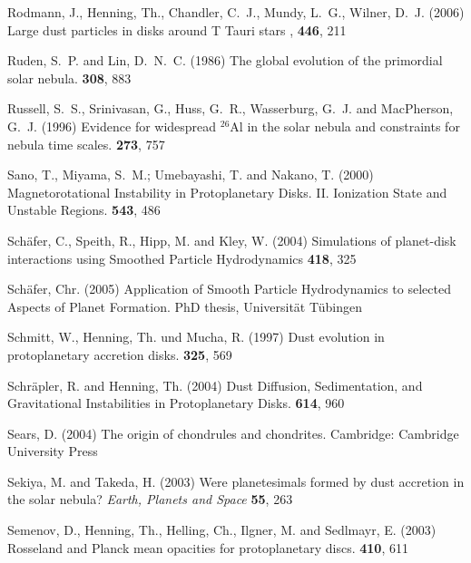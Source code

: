 \begin{literature}
\item
Rodmann, J., Henning, Th., Chandler, C.~J., Mundy, L.~G.,
Wilner, D.~J. (2006) Large dust particles in disks around T Tauri stars 
\aap, \textbf{446}, 211 

\item
Ruden, S.~P. and Lin, D.~N.~C. (1986) The global evolution of the primordial
solar nebula. \apj \textbf{308}, 883

\item
Russell, S.~S., Srinivasan, G., Huss, G.~R., Wasserburg, G.~J. and MacPherson,
G.~J. (1996) Evidence for widespread $^{26}$Al in the solar nebula and
constraints for nebula time scales. \sci \textbf{273}, 757

\item
Sano, T., Miyama, S.~M.; Umebayashi, T. and Nakano, T. (2000)
Magnetorotational Instability in Protoplanetary Disks. II. Ionization State
and Unstable Regions.
\apj \textbf{543}, 486

\item
Sch\"afer, C., Speith, R., Hipp, M. and Kley, W. (2004) Simulations of 
planet-disk interactions using Smoothed Particle Hydrodynamics 
\aap \textbf{418}, 325

\item
Sch\"afer, Chr. (2005) Application of Smooth Particle Hydrodynamics to
selected Aspects of Planet Formation. PhD thesis, Universit\"at T\"ubingen

\item
Schmitt, W., Henning, Th. und Mucha, R. (1997) Dust evolution in
protoplanetary accretion disks. \aap \textbf{325}, 569

\item
Schr\"apler, R. and Henning, Th. (2004) Dust Diffusion, Sedimentation, and
Gravitational Instabilities in Protoplanetary Disks. \apj \textbf{614}, 960

\item
Sears, D. (2004) The origin of chondrules and chondrites. Cambridge:
Cambridge University Press

\item
Sekiya, M. and Takeda, H. (2003) Were planetesimals formed by dust accretion
in the solar nebula?  \textit{Earth, Planets and Space\/} \textbf{55}, 263

\item
Semenov, D., Henning, Th., Helling, Ch., Ilgner, M. and Sedlmayr, E. (2003)
Rosseland and Planck mean opacities for protoplanetary discs. \aap
\textbf{410}, 611


\end{literature}
